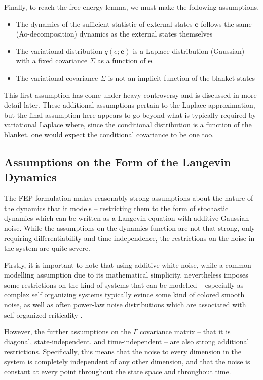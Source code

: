 Finally, to reach the free energy lemma, we must make the following assumptions,
\begin{itemize}
    \item The dynamics of the sufficient statistic of external states $\boldsymbol{e}$ follows the same (Ao-decomposition) dynamics as the external states themselves
    \item The variational distribution $q(e;\boldsymbol{e})$ is a Laplace distribution (Gaussian) with a fixed covariance $\Sigma$ as a function of $\boldsymbol{e}$.
    \item The variational covariance $\Sigma$ is not an implicit function of the blanket states
\end{itemize}
This first assumption has come under heavy controversy and is discussed in more detail later. These additional assumptions pertain to the Laplace approximation, but the final assumption here appears to go beyond what is typically required by variational Laplace where, since the conditional distribution is a function of the blanket, one would expect the conditional covariance to be one too.

\subsection{Assumptions on the Form of the Langevin Dynamics}

The FEP formulation makes reasonably strong assumptions about the nature of the dynamics that it models -- restricting them to the form of stochastic dynamics which can be written as a Langevin equation with additive Gaussian noise. While the assumptions on the dynamics function are not that strong, only requiring differentiability and time-independence, the restrictions on the noise in the system are quite severe.

Firstly, it is important to note that using additive white noise, while a common modelling assumption due to its mathematical simplicity, nevertheless imposes some restrictions on the kind of systems that can be modelled -- especially as complex self organizing systems typically evince some kind of colored smooth noise, as well as often power-law noise distributions which are associated with self-organized criticality \citep{ovchinni}.

However, the further assumptions on the $\Gamma$ covariance matrix -- that it is diagonal, state-independent, and time-independent -- are also strong additional restrictions. Specifically, this means that the noise to every dimension in the system is completely independent of any other dimension, and that the noise is constant at every point throughout the state space and throughout time.

